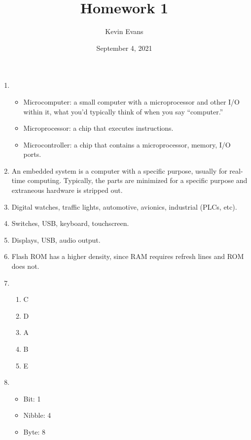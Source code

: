 \documentclass{homework}
\title{Homework 1}
\author{Kevin Evans}
\date{September 4, 2021}
\begin{document}
	\maketitle
	\begin{enumerate}
		\item \begin{itemize}
				\item Microcomputer: a small computer with a microprocessor and other I/O within it, what you'd typically think of when you say ``computer.''
				\item Microprocessor: a chip that executes instructions.
				\item Microcontroller: a chip that contains a microprocessor, memory, I/O ports.
			\end{itemize}
		
		\item An embedded system is a computer with a specific purpose, usually for real-time computing. Typically, the parts are minimized for a specific purpose and extraneous hardware is stripped out. 
		
		\item Digital watches, traffic lights, automotive, avionics, industrial (PLCs, etc). 
		
		\item Switches, USB, keyboard, touchscreen.
		
		\item Displays, USB, audio output.
		
		\item Flash ROM has a higher density, since RAM requires refresh lines and ROM does not.
		
		\item \begin{enumerate}[label={\arabic*.}]
			\item C
			\item D
			\item A
			\item B
			\item E
		\end{enumerate}
			
		\item \begin{itemize}
			\item Bit: 1
			
			\item Nibble: 4
			
			\item Byte: 8
			

\end{itemize}
\end{enumerate}
\end{document}
